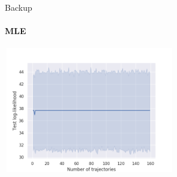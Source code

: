 \documentclass[
	english,%
	aspectratio=169,%
	color={accentcolor=3b},
	logo=true,%
	colorframetitle=false,%
	]{tudabeamer}
\begin{document}
\begin{frame}{Backup}
\framesubtitle{MLE}
\centering
\includegraphics[width=7.5cm,height=5.5cm]{figures/test_likelihood}
\end{frame}
\end{document}

